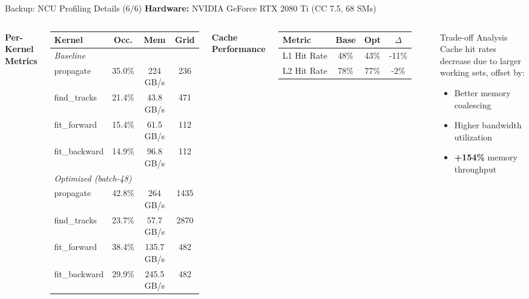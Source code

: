 \documentclass[aspectratio=169, table]{beamer}
\begin{document}
\begin{frame}{Backup: NCU Profiling Details (6/6)}
{\small \textbf{Hardware:} NVIDIA GeForce RTX 2080 Ti (CC 7.5, 68 SMs)}

\vspace{0.2em}
\begin{columns}
\textbf{Per-Kernel Metrics}
\vspace{-0.3em}
\begin{table}
    \scriptsize
    \setlength{\tabcolsep}{3pt}
    \begin{tabular}{lccc}
        \toprule
        \textbf{Kernel} & \textbf{Occ.} & \textbf{Mem} & \textbf{Grid} \\
        \midrule
        \multicolumn{4}{l}{\textit{Baseline}} \\
        propagate & 35.0\% & 224 GB/s & 236 \\
        find\_tracks & 21.4\% & 43.8 GB/s & 471 \\
        fit\_forward & 15.4\% & 61.5 GB/s & 112 \\
        fit\_backward & 14.9\% & 96.8 GB/s & 112 \\
        \midrule
        \multicolumn{4}{l}{\textit{Optimized (batch-48)}} \\
        propagate & 42.8\% & 264 GB/s & 1435 \\
        find\_tracks & 23.7\% & 57.7 GB/s & 2870 \\
        fit\_forward & 38.4\% & 135.7 GB/s & 482 \\
        fit\_backward & 29.9\% & 245.5 GB/s & 482 \\
        \bottomrule
    \end{tabular}
\end{table}

\textbf{Cache Performance}
\vspace{-0.3em}
\begin{table}
    \scriptsize
    \begin{tabular}{lccc}
        \toprule
        \textbf{Metric} & \textbf{Base} & \textbf{Opt} & \textbf{$\Delta$} \\
        \midrule
        L1 Hit Rate & 48\% & 43\% & -11\% \\
        L2 Hit Rate & 78\% & 77\% & -2\% \\
        \bottomrule
    \end{tabular}
\end{table}

\vspace{0.2em}
\begin{alertblock}{Trade-off Analysis}
\small
Cache hit rates decrease due to larger working sets, offset by:
\begin{itemize}
    \setlength{\itemsep}{0pt}
    \item Better memory coalescing
    \item Higher bandwidth utilization
    \item \textbf{+154\%} memory throughput
\end{itemize}
\end{alertblock}
\end{columns}
\end{frame}
\end{document}
